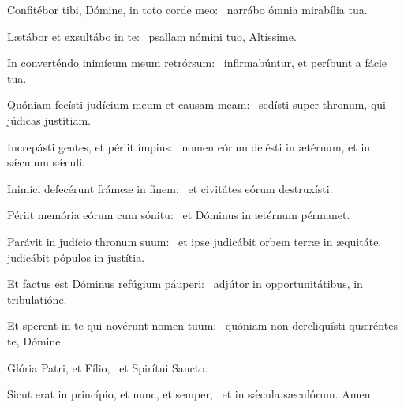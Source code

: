 \item Confitébor tibi, Dómine, in toto corde meo:~\psstar{} narrábo ómnia mirabília tua.
\item Lætábor et exsultábo in te:~\psstar{} psallam nómini tuo, Altíssime.
\item In converténdo inimícum meum retrórsum:~\psstar{} infirmabúntur, et períbunt a fácie tua.
\item Quóniam fecísti judícium meum et causam meam:~\psstar{} sedísti super thronum, qui júdicas justítiam.
\item Increpásti gentes, et périit ímpius:~\psstar{} nomen eórum delésti in ætérnum, et in sǽculum sǽculi.
\item Inimíci defecérunt frámeæ in finem:~\psstar{} et civitátes eórum destruxísti.
\item Périit memória eórum cum sónitu:~\psstar{} et Dóminus in ætérnum pérmanet.
\item Parávit in judício thronum suum:~\psstar{} et ipse judicábit orbem terræ in æquitáte, judicábit pópulos in justítia.
\item Et factus est Dóminus refúgium páuperi:~\psstar{} adjútor in opportunitátibus, in tribulatióne.
\item Et sperent in te qui novérunt nomen tuum:~\psstar{} quóniam non dereliquísti quæréntes te, Dómine.
\item Glória Patri, et Fílio,~\psstar{} et Spirítui Sancto.
\item Sicut erat in princípio, et nunc, et semper,~\psstar{} et in sǽcula sæculórum. Amen.
